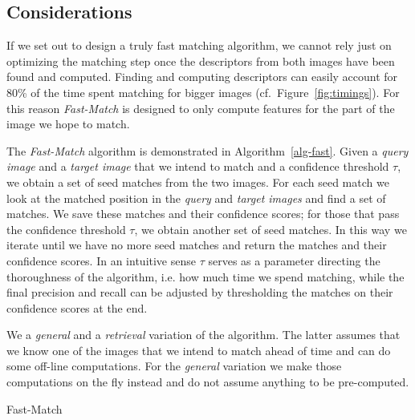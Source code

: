 \documentclass[runningheads]{llncs}
\begin{document}
\subsection{Considerations}
\label{considerations}
%
If we set out to design a truly fast matching algorithm, we cannot rely just on optimizing the matching step once the descriptors from both images have been found and computed. Finding and computing descriptors can easily account for 80\% of the time spent matching for bigger images (cf.\ Figure~\ref{fig:timings}). For this reason \emph{Fast-Match} is designed to only compute features for the part of the image we hope to match. 

The \emph{Fast-Match} algorithm is demonstrated in Algorithm~\ref{alg-fast}. Given a \emph{query image} and a \emph{target image} that we intend to match and a confidence threshold $\tau$, we obtain a set of seed matches from the two images. For each seed match we look at the matched position in the \emph{query} and \emph{target images} and find a set of matches. We save these matches and their confidence scores; for those that pass the confidence threshold $\tau$, we obtain another set of seed matches. In this way we iterate until we have no more seed matches and return the matches and their confidence scores. In an intuitive sense $\tau$ serves as a parameter directing the thoroughness of the algorithm, i.e. how much time we spend matching, while the final precision and recall can be adjusted by thresholding the matches on their confidence scores at the end.

We a \emph{general} and a \emph{retrieval} variation of the algorithm. The latter assumes that we know one of the images that we intend to match ahead of time and can do some off-line computations. For the \emph{general} variation we make those computations on the fly instead and do not assume anything to be pre-computed. 

\begin{algorithm}[htb]
\caption{Fast-Match}
\label{alg-fast}
\end{algorithm}
\end{document}
